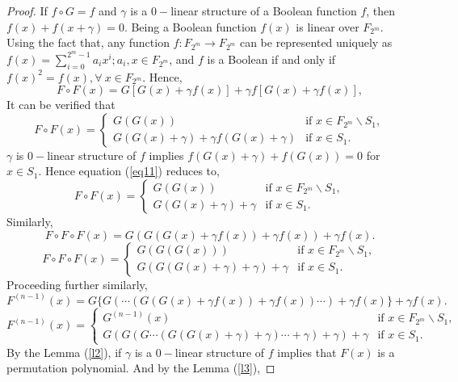 \documentclass[12pt,a4paper]{article}
\begin{document}
\begin{proof}
	If $ f\circ G=f $ and  $ \gamma $ is a $ 0-$linear structure of a Boolean function  $ f $, then $ f(x)+f(x+\gamma)=0 $. Being a Boolean function  $ f(x) $ is linear over $F_{2^{m}}$. Using the fact that,
	any function $ f:F_{2^{m}}\rightarrow F_{2^{m}}  $ can be   represented uniquely as $ f(x)=\sum\limits_{i=0}^{2^{m}-1}a_{i}x^{i} ; a_{i},x\in F_{2^{m}} $, and $ f $ is a Boolean if and only if $ f(x)^{2}=f(x) ,\forall~ x\in F_{2^{m}}$. Hence,
	\begin{equation}
		F\circ F(x)= G[G(x)+\gamma f(x)]+\gamma f[G(x)+\gamma f(x)],
	\end{equation}
    It can be verified that
	\begin{equation}\label{eq11}
		F\circ F(x)=\begin{cases}
			G(G(x)) & \text{if } x\in F_{2^{m}}\backslash S_{1},\\
			G(G(x)+\gamma)+\gamma  f(G(x)+\gamma) & \text{if } x\in S_{1}.	
		\end{cases}
	\end{equation}
    $\gamma$ is $0-$linear structure of $f$ implies $f(G(x)+\gamma)+f(G(x))=0$ for $x\in S_1$. Hence equation (\ref{eq11}) reduces to,
    \begin{equation}\label{eq12}
		F\circ F(x)=\begin{cases}
			G(G(x)) & \text{if } x\in F_{2^{m}}\backslash S_{1},\\
			G(G(x)+\gamma)+\gamma   & \text{if } x\in S_{1}.	
		\end{cases}
	\end{equation}
	Similarly,
	\begin{equation}
		F\circ F\circ F(x)=G(G(G(x)+\gamma f(x))+\gamma f(x))+\gamma f(x).
	\end{equation}
	\begin{equation}
		F\circ F\circ F(x)=\begin{cases}
			G(G(G(x))) & \text{if } x\in F_{2^{m}}\backslash S_{1},\\
			G(G(G(x)+\gamma)+\gamma)+\gamma & \text{if } x\in S_{1}.
		\end{cases}
	\end{equation}
	Proceeding further similarly,
	\begin{equation}
		F^{(n-1)}(x)=G\{G(\cdots(G(G(x)+\gamma f(x) )+\gamma f(x) )\cdots)+\gamma f(x)\}+\gamma f(x). 
	\end{equation}
	\begin{equation}
		F^{(n-1)}(x)=\begin{cases}
			G^{(n-1)}(x) & \text{if } x\in F_{2^{m}}\backslash S_{1},\\
			G(G(G\cdots(G(G(x)+\gamma )+\gamma )\cdots+\gamma)+\gamma )+\gamma & \text{if } x\in S_{1}.
		\end{cases}
	\end{equation}
	By the Lemma (\ref{l2}), if  $ \gamma  $ is a $0-$linear structure of $ f $   implies that $ F(x) $ is a permutation polynomial. And by the Lemma (\ref{l3}),
    

\end{proof}
\end{document}
